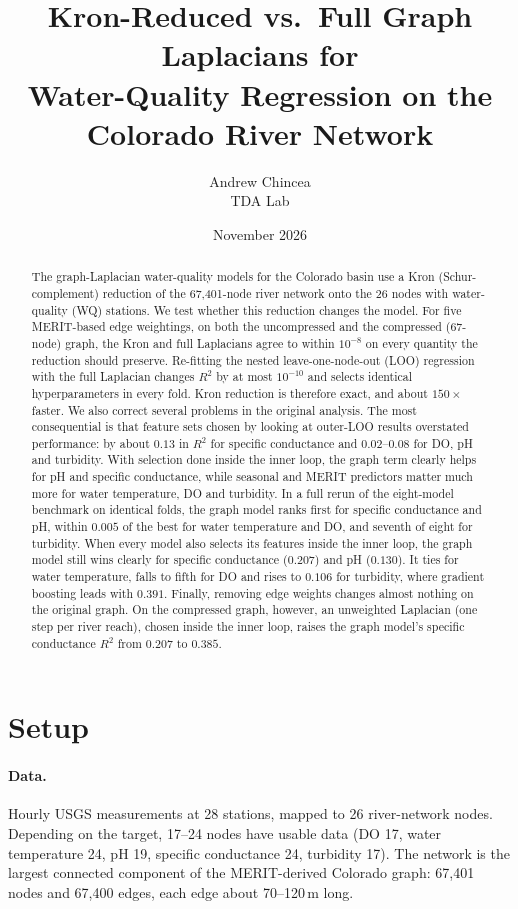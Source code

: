 \documentclass[11pt]{article}
\title{Kron-Reduced vs.\ Full Graph Laplacians for\\
       Water-Quality Regression on the Colorado River Network}
\author{Andrew Chincea \\ TDA Lab}
\date{November 2026}
\begin{document}
\maketitle

\begin{abstract}
The graph-Laplacian water-quality models for the Colorado basin use a Kron (Schur-complement)
reduction of the 67{,}401-node river network onto the 26 nodes with water-quality (WQ) stations.
We test whether this reduction changes the model. For five MERIT-based edge weightings, on both
the uncompressed and the compressed (67-node) graph, the Kron and full Laplacians agree to within
$10^{-8}$ on every quantity the reduction should preserve. Re-fitting the nested
leave-one-node-out (LOO) regression with the full Laplacian changes $R^2$ by at most
$10^{-10}$ and selects identical hyperparameters in every fold. Kron reduction is therefore exact,
and about $150\times$ faster. We also correct several problems in the original analysis. The most
consequential is that feature sets chosen by looking at outer-LOO results overstated performance:
by about $0.13$ in $R^2$ for specific conductance and $0.02$--$0.08$ for DO, pH and turbidity.
With selection done inside the inner loop, the graph term clearly helps for pH and specific
conductance, while seasonal and MERIT predictors matter much more for water temperature, DO and
turbidity. In a full rerun of the eight-model benchmark on identical folds, the graph model ranks
first for specific conductance and pH, within $0.005$ of the best for water temperature and DO, and
seventh of eight for turbidity. When every model also selects its features inside the inner loop, the
graph model still wins clearly for specific conductance ($0.207$) and pH ($0.130$). It ties for water
temperature, falls to fifth for DO and rises to $0.106$ for turbidity, where gradient boosting leads
with $0.391$. Finally, removing edge weights changes almost nothing on the original graph. On the
compressed graph, however, an unweighted Laplacian (one step per river reach), chosen inside the inner
loop, raises the graph model's specific conductance $R^2$ from $0.207$ to $0.385$.
\end{abstract}

\section{Setup}

\paragraph{Data.} Hourly USGS measurements at 28 stations, mapped to 26 river-network nodes.
Depending on the target, 17--24 nodes have usable data
(DO 17, water temperature 24, pH 19, specific conductance 24, turbidity 17).
The network is the largest connected component of the MERIT-derived Colorado graph:
67{,}401 nodes and 67{,}400 edges, each edge about 70--120\,m long.
\end{document}
